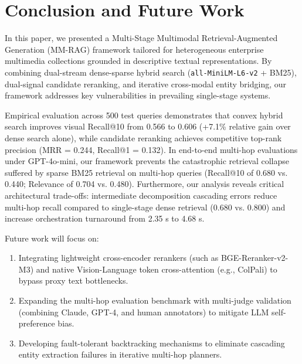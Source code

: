 \documentclass[conference]{IEEEtran}
\begin{document}
\section{Conclusion and Future Work}

In this paper, we presented a Multi-Stage Multimodal Retrieval-Augmented Generation (MM-RAG) framework tailored for heterogeneous enterprise multimedia collections grounded in descriptive textual representations. By combining dual-stream dense-sparse hybrid search (\texttt{all-MiniLM-L6-v2} + BM25), dual-signal candidate reranking, and iterative cross-modal entity bridging, our framework addresses key vulnerabilities in prevailing single-stage systems.

Empirical evaluation across 500 test queries demonstrates that convex hybrid search improves visual Recall@10 from 0.566 to 0.606 (+7.1\% relative gain over dense search alone), while candidate reranking achieves competitive top-rank precision (MRR = 0.244, Recall@1 = 0.132). In end-to-end multi-hop evaluations under GPT-4o-mini, our framework prevents the catastrophic retrieval collapse suffered by sparse BM25 retrieval on multi-hop queries (Recall@10 of 0.680 vs. 0.440; Relevance of 0.704 vs. 0.480). Furthermore, our analysis reveals critical architectural trade-offs: intermediate decomposition cascading errors reduce multi-hop recall compared to single-stage dense retrieval (0.680 vs. 0.800) and increase orchestration turnaround from 2.35 s to 4.68 s.

Future work will focus on:
\begin{enumerate}
    \item Integrating lightweight cross-encoder rerankers (such as BGE-Reranker-v2-M3) and native Vision-Language token cross-attention (e.g., ColPali) to bypass proxy text bottlenecks.
    \item Expanding the multi-hop evaluation benchmark with multi-judge validation (combining Claude, GPT-4, and human annotators) to mitigate LLM self-preference bias.
    \item Developing fault-tolerant backtracking mechanisms to eliminate cascading entity extraction failures in iterative multi-hop planners.
\end{enumerate}
\end{document}
